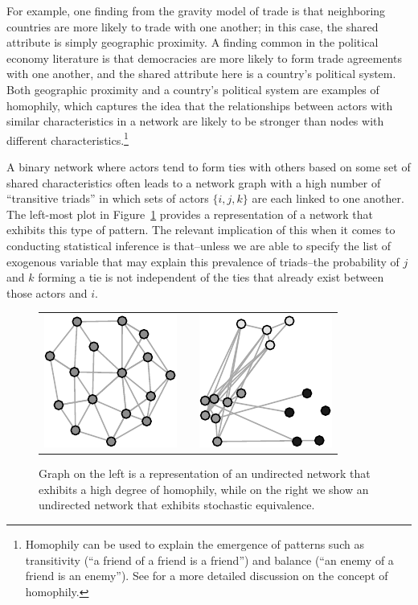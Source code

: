 \documentclass[9pt,twocolumn,twoside,lineno]{pnas-new}
\begin{document}
For example, one finding from the gravity model of trade is that neighboring countries are more likely to trade with one another; in this case, the shared attribute is simply geographic proximity. A finding common in the political economy literature is that democracies are more likely to form trade agreements with one another, and the shared attribute here is a country's political system. Both geographic proximity and a country's political system are examples of homophily, which captures the idea that the relationships between actors with similar characteristics in a network are likely to be stronger than nodes with different characteristics.\footnote{Homophily can be used to explain the emergence of patterns such as transitivity (``a friend of a friend is a friend'') and balance (``an enemy of a friend is an enemy''). See \cite{shalizi:thomas:2011} for a more detailed discussion on the concept of homophily.}

A binary network where actors tend to form ties with others based on some set of shared characteristics often leads to a network graph with a high number of ``transitive triads'' in which  sets of actors $\{i,j,k\}$ are each linked to one another. The left-most plot in Figure~\ref{fig:homphStochEquivNet} provides a representation of a network that exhibits this type of pattern. The relevant implication of this when it comes to conducting statistical inference is that--unless we are able to specify the list of exogenous variable that may explain this prevalence of triads--the probability of $j$ and $k$ forming a tie is not independent of the ties that already exist between those actors and $i$.

\begin{figure}[ht]
	\centering
	\caption{Graph on the left is a representation of an undirected network that exhibits a high degree of homophily, while on the right we show an undirected network that exhibits stochastic equivalence.}	
	\begin{tabular}{lcr}
	\includegraphics[width=.15\textwidth]{homophNet} & \hspace{2cm} &
	\includegraphics[width=.15\textwidth]{stochEquivNet}
	\end{tabular}
	\label{fig:homphStochEquivNet}
\end{figure}
\end{document}

